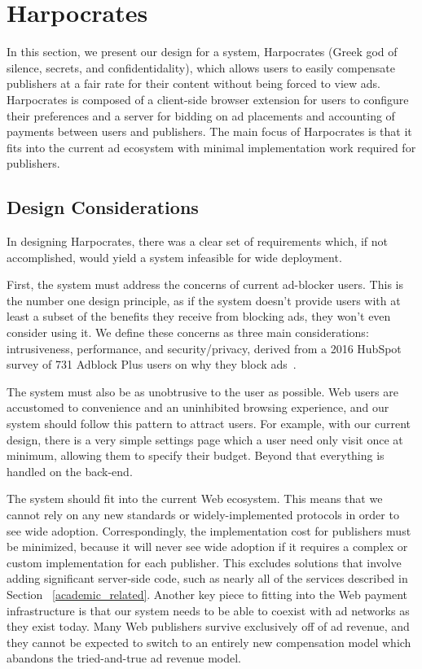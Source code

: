 \section{Harpocrates}
In this section, we present our design for a system, Harpocrates (Greek god of silence, secrets, and confidentidality), which allows users to easily compensate publishers at a fair rate for their content without being forced to view ads.
Harpocrates is composed of a client-side browser extension for users to configure their preferences and a server for bidding on ad placements and accounting of payments between users and publishers.
The main focus of Harpocrates is that it fits into the current ad ecosystem with minimal implementation work required for publishers.

\subsection{Design Considerations}
In designing Harpocrates, there was a clear set of requirements which, if not accomplished, would yield a system infeasible for wide deployment.

First, the system must address the concerns of current ad-blocker users. This is the number one design principle, as if the system doesn't provide users with at least a subset of the benefits they receive from blocking ads, they won't even consider using it. We define these concerns as three main considerations: intrusiveness, performance, and security/privacy, derived from a 2016 HubSpot survey of 731 Adblock Plus users on why they block ads~\cite{hubspot2016adblock}.

The system must also be as unobtrusive to the user as possible.
Web users are accustomed to convenience and an uninhibited browsing experience, and our system should follow this pattern to attract users.
For example, with our current design, there is a very simple settings page which a user need only visit once at minimum, allowing them to specify their budget.
Beyond that everything is handled on the back-end.

The system should fit into the current Web ecosystem.
This means that we cannot rely on any new standards or widely-implemented protocols in order to see wide adoption.
Correspondingly, the implementation cost for publishers must be minimized, because it will never see wide adoption if it requires a complex or custom implementation for each publisher.
This excludes solutions that involve adding significant server-side code, such as nearly all of the services described in Section ~\ref{academic_related}.
Another key piece to fitting into the Web payment infrastructure is that our system needs to be able to coexist with ad networks as they exist today.
Many Web publishers survive exclusively off of ad revenue, and they cannot be expected to switch to an entirely new compensation model which abandons the tried-and-true ad revenue model.

